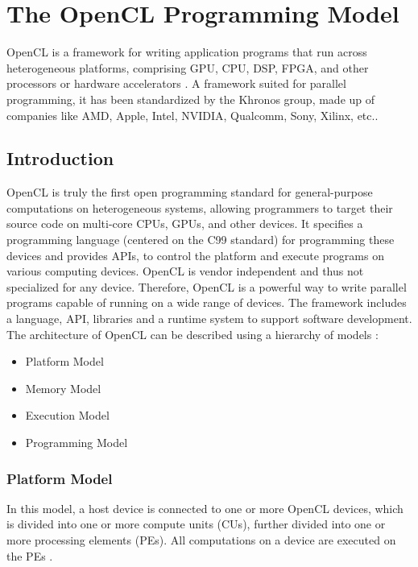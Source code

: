 \chapter{The OpenCL Programming Model}
\label{ch4_opencl}

OpenCL is a framework for writing application programs that run across heterogeneous platforms, comprising \ac{GPU}, \ac{CPU}, \ac{DSP}, \ac{FPGA}, and other processors or hardware accelerators \cite{opencl_wiki}. A framework suited for parallel programming, it has been standardized by the Khronos group, made up of companies like AMD, Apple, Intel, NVIDIA, Qualcomm, Sony, Xilinx, etc.\cite{opencl_fixstars}.

\section{Introduction}
\label{sect4_1}

OpenCL is truly the first open programming standard for general-purpose computations on heterogeneous systems, allowing programmers to target their source code on multi-core CPUs, GPUs, and other devices. It specifies a programming language (centered on the C99 standard) for programming these devices and provides \ac{API}s, to control the platform and execute programs on various computing devices. OpenCL is vendor independent and thus not specialized for any device. Therefore, OpenCL is a powerful way to write parallel programs capable of running on a wide range of devices. \newline\newline
The framework includes a language, API, libraries and a runtime system to support software development. The architecture of OpenCL can be described using a hierarchy of models \cite{opencl_ajg}:

\begin{itemize}
\item Platform Model
\item Memory Model
\item Execution Model
\item Programming Model
\end{itemize}

\subsection{Platform Model}
\label{sect4_1_1}
In this model, a host device is connected to one or more OpenCL devices, which is divided into one or more compute units (CUs), further divided into one or more processing elements (PEs). All computations on a device are executed on the PEs \cite{opencl_khronos}.

